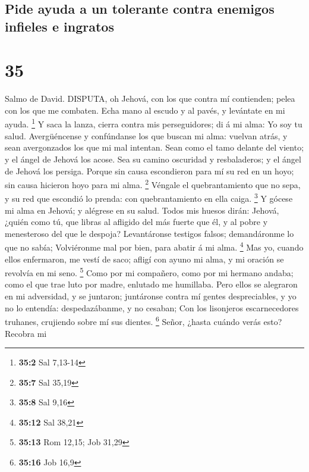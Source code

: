 \hypertarget{pide-ayuda-a-un-tolerante-contra-enemigos-infieles-e-ingratos}{%
\subsection{Pide ayuda a un tolerante contra enemigos infieles e
ingratos}\label{pide-ayuda-a-un-tolerante-contra-enemigos-infieles-e-ingratos}}

\hypertarget{section-34}{%
\section{35}\label{section-34}}

 Salmo de David. DISPUTA, oh Jehová, con los que contra mí
contienden; pelea con los que me combaten.  Echa mano al
escudo y al pavés, y levántate en mi ayuda. \footnote{\textbf{35:2} Sal
  7,13-14}  Y saca la lanza, cierra contra mis
perseguidores; di á mi alma: Yo soy tu salud.  Avergüéncense
y confúndanse los que buscan mi alma: vuelvan atrás, y sean avergonzados
los que mi mal intentan.  Sean como el tamo delante del
viento; y el ángel de Jehová los acose.  Sea su camino
oscuridad y resbaladeros; y el ángel de Jehová los persiga. 
Porque sin causa escondieron para mí su red en un hoyo; sin causa
hicieron hoyo para mi alma. \footnote{\textbf{35:7} Sal 35,19}
 Véngale el quebrantamiento que no sepa, y su red que
escondió lo prenda: con quebrantamiento en ella caiga. \footnote{\textbf{35:8}
  Sal 9,16}  Y gócese mi alma en Jehová; y alégrese en su
salud.  Todos mis huesos dirán: Jehová, ¿quién como tú, que
libras al afligido del más fuerte que él, y al pobre y menesteroso del
que le despoja?  Levantáronse testigos falsos; demandáronme
lo que no sabía;  Volviéronme mal por bien, para abatir á
mi alma. \footnote{\textbf{35:12} Sal 38,21}  Mas yo,
cuando ellos enfermaron, me vestí de saco; afligí con ayuno mi alma, y
mi oración se revolvía en mi seno. \footnote{\textbf{35:13} Rom 12,15;
  Job 31,29}  Como por mi compañero, como por mi hermano
andaba; como el que trae luto por madre, enlutado me humillaba.
 Pero ellos se alegraron en mi adversidad, y se juntaron;
juntáronse contra mí gentes despreciables, y yo no lo entendía:
despedazábanme, y no cesaban;  Con los lisonjeros
escarnecedores truhanes, crujiendo sobre mí sus dientes. \footnote{\textbf{35:16}
  Job 16,9}  Señor, ¿hasta cuándo verás esto? Recobra mi
